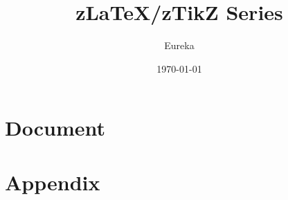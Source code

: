 \documentclass[
    lang=cn, 
    layout=oneside, 
    margin=false, 
    math-alias=true,
    toc={rename, 2column},
]{zlatex}
\title{z\LaTeX{}/zTikZ Series}
\author{Eureka}
\date{\today}
\begin{document}
\maketitle
\frontmatter
\tableofcontents
\mainmatter
\part{Document}



\printindex


\part{Appendix}


\end{document}
